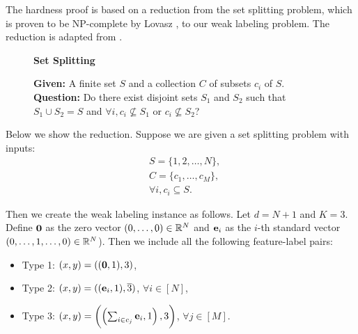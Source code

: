 
The hardness proof is based on a reduction from the set splitting problem, which is proven to be NP-complete by Lovasz \cite{Garey-Johnson-1979}, to our weak labeling problem. The reduction is adapted from \cite{Blum-Rivest-1993}. 
\begin{figure}[h]
\begin{framed}
\begin{center}
    \textbf{Set Splitting}
\end{center}
\textbf{Given: } A finite set $S$ and a collection $C$ of subsets $c_i$ of $S$. \\
\textbf{Question: } Do there exist disjoint sets $S_1$ and $S_2$ such that $S_1 \cup S_2 = S$ and $\forall i, c_i\not\subseteq S_1$ or $c_i\not\subseteq S_2$?
\end{framed}
\end{figure}

Below we show the reduction. Suppose we are given a set splitting problem with inputs:
\begin{align*}
    &S = \{1, 2, \ldots, N\}, \\
    &C = \{c_1, \ldots, c_M\}, \\
    &\forall i, c_i \subseteq S.
\end{align*}

Then we create the weak labeling instance as follows. Let $d=N+1$ and $K=3$. Define $\mathbf{0}$ as the zero vector $(0,\ldots, 0)\in \mathbb{R}^N$ and $\mathbf{e}_i$ as the $i$-th standard vector $(0,\ldots, 1, \ldots, 0)\in \mathbb{R}^N$). Then we include all the following feature-label pairs:
\begin{itemize}
    \item Type 1: $(x,y)=((\mathbf{0},1), 3)$,
    \item Type 2: $(x,y)=((\mathbf{e}_i,1), \overline{3})$, $\forall i\in [N]$,
    \item Type 3: $(x,y)=\left(\left(\sum_{i\in c_j} \mathbf{e}_i, 1\right), 3\right)$, $\forall j\in[M]$.
\end{itemize}

